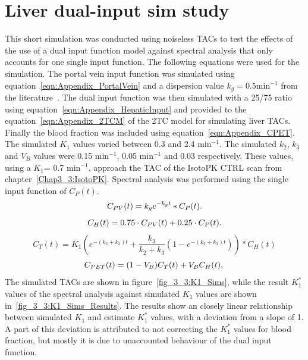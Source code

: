 \section*{Liver dual-input sim study}
This short simulation was conducted using noiseless TACs to test the effects of the use of a dual input function model against spectral analysis that only accounts for one single input function.  
The following equations were used for the simulation. The portal vein input function was simulated using equation~\ref{eqn:Appendix_PortalVein} and a dispersion value $k_g=0.5 \mathrm{min}^{-1}$ from the literature~\cite{Kudomi2008}.
The dual input function was then simulated with a 25/75 ratio using equation~\ref{eqn:Appendix_HepaticInput} and provided to the equation~\ref{eqn:Appendix_2TCM} of the 2TC model for simulating liver TACs. Finally the blood fraction was included using equation~\ref{eqn:Appendix_CPET}. The simulated $K_1$ values varied between 0.3 and 2.4 min$^{-1}$. The simulated $k_2$, $k_3$ and $V_B$ values were 0.15 min$^{-1}$, 0.05 min$^{-1}$ and 0.03 respectively. These values, using a $K_1$= 0.7 min$^{-1}$, approach the TAC of the IsotoPK CTRL scan from chapter~\ref{Chap3_3:IsotoPK}. 
Spectral analysis was performed using the single input function of $C_{P}(t)$. 
%
\begin{equation} 
{C_{PV}}(t)  = {k_g} e^{-k_g t} \ast C_P(t)   \\ . \\
\label{eqn:Appendix_PortalVein}
\end{equation}
%
\begin{equation} 
{C_{H}}(t)  = 0.75 \cdot C_{PV}(t) + 0.25 \cdot C_{P}(t)  \\ . \\
\label{eqn:Appendix_HepaticInput}
\end{equation}
%
\begin{equation}
C_T(t) = K_1 ( e^{-(k_2+k_3)t} + \frac{k_3}{k_2+k_3}(1-e^{-(k_2+k_3)t})) \ast C_{H}(t)   
\label{eqn:Appendix_2TCM}
\end{equation}
%
\begin{equation}
{C_{PET}}(t)  = (1-V_{B}){C_{T}}(t) + V_{B}C_{H}(t) \\ , \\
\label{eqn:Appendix_CPET}
\end{equation}
%
%
The simulated TACs are shown in figure~\ref{fig_3_3:K1_Sims}, while the result $K_1^{*}$ values of the spectral analysis against simulated $K_1$ values are shown in~\ref{fig_3_3:K1_Sims_Results}. The results show an closely linear relationship between simulated $K_1$ and estimate $K_1^{*}$ values, with a deviation from a slope of 1. A part of this deviation is attributed to not correcting the $K_1^{*}$ values for blood fraction, but mostly it is due to unaccounted behaviour of the dual input function.
